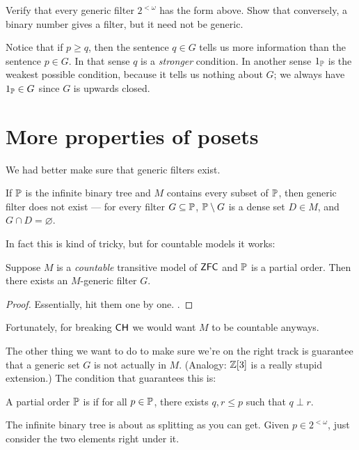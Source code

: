 \begin{exercise}
	Verify that every generic filter $2^{<\omega}$ has the form above.
	Show that conversely, a binary number gives a filter, but it need not be generic.
\end{exercise}

Notice that if $p \ge q$, then the sentence $q \in G$ tells us more information than the sentence $p \in G$.
In that sense $q$ is a \emph{stronger} condition.
In another sense $1_\mathbb P$ is the weakest possible condition,
because it tells us nothing about $G$; we always have $1_\mathbb P \in G$
since $G$ is upwards closed.

\section{More properties of posets}
We had better make sure that generic filters exist.
\begin{example}
	If $\mathbb P$ is the infinite binary tree and $M$ contains every subset of $\mathbb P$, then generic filter
	does not exist --- for every filter $G \subseteq \mathbb P$, $\mathbb P \setminus G$ is a dense set $D \in
	M$, and $G \cap D = \varnothing$.
\end{example}
In fact this is kind of tricky, but for countable models it works:
\begin{lemma}
	Suppose $M$ is a \emph{countable} transitive model of $\mathsf{ZFC}$
	and $\mathbb P$ is a partial order.
	Then there exists an $M$-generic filter $G$.
\end{lemma}
\begin{proof}
	Essentially, hit them one by one.
	.
\end{proof}

Fortunately, for breaking $\mathsf{CH}$ we would want $M$ to be countable anyways.

The other thing we want to do to make sure we're on the right track is guarantee
that a generic set $G$ is not actually in $M$.
(Analogy: $\mathbb Z[3]$ is a really stupid extension.)
The condition that guarantees this is:

\begin{definition}
	A partial order $\mathbb P$ is  if
	for all $p \in \mathbb P$, there exists $q,r \le p$
	such that $q \perp r$.
\end{definition}
\begin{example}
	The infinite binary tree is about as splitting as you can get.
	Given $p \in 2^{<\omega}$, just consider the two elements right under it.
\end{example}

